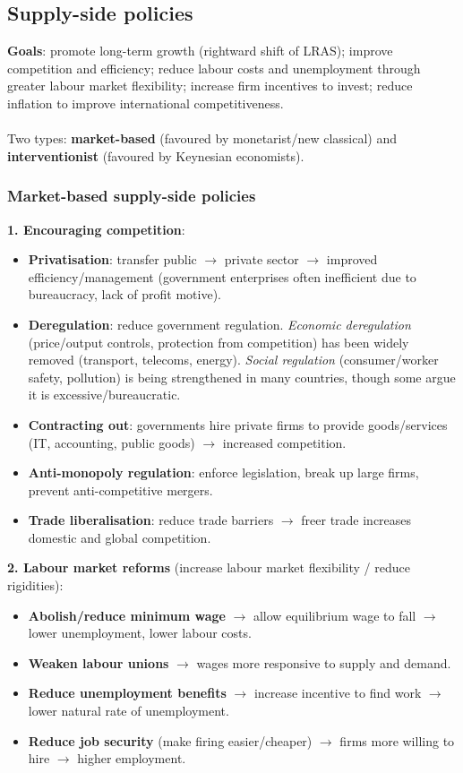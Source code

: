 \subsection{Supply-side policies}
\textbf{Goals}: promote long-term growth (rightward shift of LRAS); improve competition and efficiency; reduce labour costs and unemployment through greater labour market flexibility; increase firm incentives to invest; reduce inflation to improve international competitiveness.
\\\\
Two types: \textbf{market-based} (favoured by monetarist/new classical) and \textbf{interventionist} (favoured by Keynesian economists).

\subsubsection*{Market-based supply-side policies}
\textbf{1. Encouraging competition}:
\begin{itemize}
  \item \textbf{Privatisation}: transfer public $\to$ private sector $\to$ improved efficiency/management (government enterprises often inefficient due to bureaucracy, lack of profit motive).
  \item \textbf{Deregulation}: reduce government regulation. \textit{Economic deregulation} (price/output controls, protection from competition) has been widely removed (transport, telecoms, energy). \textit{Social regulation} (consumer/worker safety, pollution) is being strengthened in many countries, though some argue it is excessive/bureaucratic.
  \item \textbf{Contracting out}: governments hire private firms to provide goods/services (IT, accounting, public goods) $\to$ increased competition.
  \item \textbf{Anti-monopoly regulation}: enforce legislation, break up large firms, prevent anti-competitive mergers.
  \item \textbf{Trade liberalisation}: reduce trade barriers $\to$ freer trade increases domestic and global competition.
\end{itemize}
\textbf{2. Labour market reforms} (increase labour market flexibility / reduce rigidities):
\begin{itemize}
  \item \textbf{Abolish/reduce minimum wage} $\to$ allow equilibrium wage to fall $\to$ lower unemployment, lower labour costs.
  \item \textbf{Weaken labour unions} $\to$ wages more responsive to supply and demand.
  \item \textbf{Reduce unemployment benefits} $\to$ increase incentive to find work $\to$ lower natural rate of unemployment.
  \item \textbf{Reduce job security} (make firing easier/cheaper) $\to$ firms more willing to hire $\to$ higher employment.
\end{itemize}
